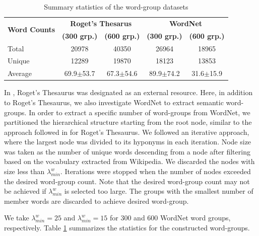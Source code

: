 \documentclass[11pt,a4paper]{article}
\begin{document}
\begin{table}
    \centering
	\begin{tabular}{lcccc}
	    \hline \hline
         \multirow{2}{*}{\textbf{Word Counts}} & \multicolumn{2}{c}{\textbf{Roget's Thesarus}}  & \multicolumn{2}{c}{\textbf{WordNet}} \\
         & \textbf{(300 grp.)} & \textbf{(600 grp.)} & \textbf{(300 grp.)} & \textbf{(600 grp.)} \\ \hline \hline %
         Total & 20978 & 40350 & 26964 & 18965 \\ 
         Unique & 12289 & 19870 & 18123 & 13853 \\
         Average & 69.9$\pm$53.7 & 67.3$\pm$54.6 & 89.9$\pm$74.2 & 31.6$\pm$15.9 \\ \hline \hline %
	\end{tabular}
	\caption{Summary statistics of the word-group datasets}
	\label{tab:roget_vs_wordnet}
\end{table}

In \citet{senel20impart}, Roget's Thesaurus \citep{Roget2008thesaurus} was designated as an external resource.
Here, in addition to Roget's Thesaurus, we also investigate  WordNet \citep{miller95wordnet} to extract semantic word-groups.
In order to extract a specific number of word-groups from WordNet, we partitioned the hierarchical structure starting from the root node, similar to the approach followed in \citet{senel20impart} for Roget's Thesaurus. We followed an iterative approach, where the largest node was divided to its hyponyms in each iteration. Node size was taken as the number of unique words descending from a node after filtering based on the vocabulary extracted from Wikipedia. We discarded the nodes with size less than $\lambda_{min}^w$. Iterations were stopped when the number of nodes exceeded the desired word-group count. Note that the desired word-group count may not be achieved if $\lambda_{min}^w$ is selected too large.
The groups with the smallest number of member words are discarded to achieve desired word-group.

We take $\lambda_{min}^w = 25$ and $\lambda_{min}^w = 15$ for 300 and 600 WordNet word groups, respectively.
Table \ref{tab:roget_vs_wordnet} summarizes the statistics for the constructed word-groups. 
\end{document}
